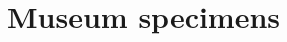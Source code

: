 \documentclass[12pt,a4paper]{article}
\begin{document}
\newpage
\section{Museum specimens}
	



\end{document}
